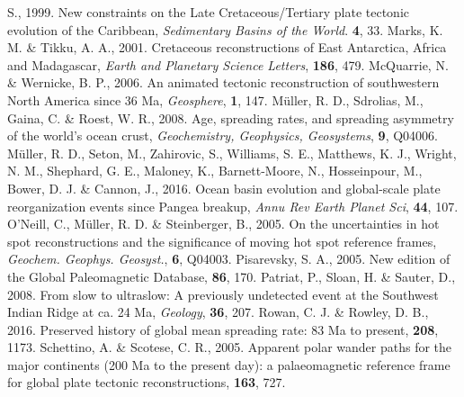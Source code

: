 \begin{thebibliography}{}
  S., 1999. New constraints on the Late Cretaceous/Tertiary plate tectonic
  evolution of the Caribbean, \textit{Sedimentary Basins of the World}.
  \textbf{4}, 33.
  Marks, K. M. \& Tikku, A. A., 2001. Cretaceous reconstructions of East
  Antarctica, Africa and Madagascar, \textit{Earth and Planetary Science
  Letters}, \textbf{186}, 479.
  McQuarrie, N. \& Wernicke, B. P., 2006. An animated tectonic reconstruction of
  southwestern North America since 36 Ma, \textit{Geosphere}, \textbf{1},
  147.
  M{\"{u}}ller, R. D., Sdrolias, M., Gaina, C. \& Roest, W. R., 2008. Age,
  spreading rates, and spreading asymmetry of the world's ocean crust,
  \textit{Geochemistry, Geophysics, Geosystems}, \textbf{9}, Q04006.
  M{\"{u}}ller, R. D., Seton, M., Zahirovic, S., Williams, S. E., Matthews, K.
  J., Wright, N. M., Shephard, G. E., Maloney, K., Barnett-Moore, N.,
  Hosseinpour, M., Bower, D. J. \& Cannon, J., 2016. Ocean basin evolution and
  global-scale plate reorganization events since Pangea breakup, \textit{Annu
  Rev Earth Planet Sci}, \textbf{44}, 107.
  O'Neill, C., M{\"{u}}ller, R. D. \& Steinberger, B., 2005. On the
  uncertainties in hot spot reconstructions and the significance of moving hot
  spot reference frames, \textit{Geochem. Geophys. Geosyst.}, \textbf{6},
  Q04003.
  Pisarevsky, S. A., 2005. New edition of the Global Paleomagnetic Database,
  \eos{}\textbf{86}, 170.
  Patriat, P., Sloan, H. \& Sauter, D., 2008. From slow to ultraslow: A
  previously undetected event at the Southwest Indian Ridge at ca. 24 Ma,
  \textit{Geology}, \textbf{36}, 207.
  Rowan, C. J. \& Rowley, D. B., 2016. Preserved history of global mean
  spreading rate: 83 Ma to present, \gji{}\textbf{208}, 1173.
  Schettino, A. \& Scotese, C. R., 2005. Apparent polar wander paths for the
  major continents (200 Ma to the present day): a palaeomagnetic reference frame
  for global plate tectonic reconstructions, \gji{}\textbf{163},
  727.

\end{thebibliography}
